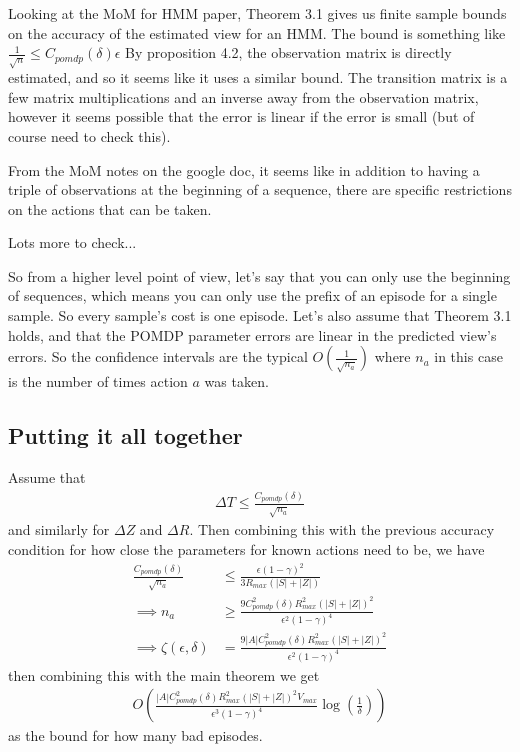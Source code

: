 \documentclass[10pt,english]{article}
\begin{document}
Looking at the MoM for HMM paper, Theorem 3.1 gives us finite sample bounds on the accuracy of the estimated view for an HMM. The bound is something like $\frac{1}{\sqrt{n}} \leq C_{pomdp}(\delta) \epsilon$ By proposition 4.2, the observation matrix is directly estimated, and so it seems like it uses a similar bound. The transition matrix is a few matrix multiplications and an inverse away from the observation matrix, however it seems possible that the error is linear if the error is small (but of course need to check this).

From the MoM notes on the google doc, it seems like in addition to having a triple of observations at the beginning of a sequence, there are specific restrictions on the actions that can be taken.

Lots more to check...

So from a higher level point of view, let's say that you can only use the beginning of sequences, which means you can only use the prefix of an episode for a single sample. So every sample's cost is one episode. Let's also assume that Theorem 3.1 holds, and that the POMDP parameter errors are linear in the predicted view's errors. So the confidence intervals are the typical $O \left( \frac{1}{\sqrt{n_a}} \right)$ where $n_a$ in this case is the number of times action $a$ was taken.

\subsection{Putting it all together}

Assume that
\begin{align}
\Delta T \leq \frac{C_{pomdp}(\delta)}{\sqrt{n_a}}
\end{align}
and similarly for $\Delta Z$ and $\Delta R$. Then combining this with the previous accuracy condition for how close the parameters for known actions need to be, we have
\begin{align}
\frac{C_{pomdp}(\delta)}{\sqrt{n_a}} &\leq \frac{\epsilon(1-\gamma)^2}{3 R_{max}(|S| + |Z|)} \\
\implies n_a &\geq \frac{9 C_{pomdp}^2(\delta) R_{max}^2(|S| + |Z|)^2}{\epsilon^2(1-\gamma)^4} \\
\implies \zeta(\epsilon, \delta) &= \frac{9 |A| C_{pomdp}^2(\delta) R_{max}^2(|S| + |Z|)^2}{\epsilon^2(1-\gamma)^4}
\end{align}
then combining this with the main theorem we get
\begin{align}
	O\left(\frac{|A| C_{pomdp}^2(\delta) R_{max}^2(|S| + |Z|)^2V_{max}}{\epsilon^3(1-\gamma)^4}\log\left(\frac{1}{\delta}\right)\right)
\end{align}
as the bound for how many bad episodes.
\end{document}
